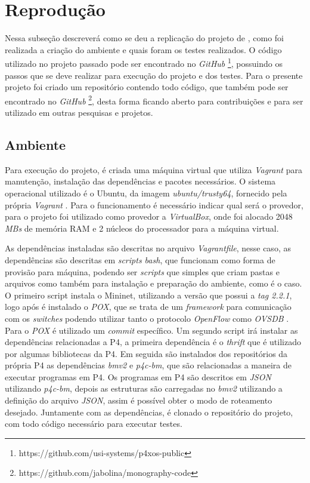 \documentclass[
    12pt,
    openright, 
    oneside,
    a4paper,
    french,
    english,
    brazil
    ]{facom-ufu-abntex2}
\theoremstyle{definition}
\begin{document}
\section{Reprodução}
Nessa subseção descreverá como se deu a replicação do projeto de \cite{dang2016paxos}, como foi realizada 
a criação do ambiente e quais foram os testes
realizados. O código utilizado no projeto passado pode ser encontrado no \emph{GitHub}
\footnote{https://github.com/usi-systems/p4xos-public}, possuindo os passos que
se deve realizar para execução do projeto e dos testes. Para o presente projeto foi 
criado um repositório contendo todo código, que também pode ser encontrado no \emph{GitHub}
\footnote{https://github.com/jabolina/monography-code}, desta forma ficando aberto
para contribuições e para ser utilizado em outras pesquisas e projetos.

\subsection{Ambiente}
Para execução do projeto, é criada uma máquina virtual que utiliza \emph{Vagrant} para
manutenção, instalação das dependências e pacotes necessários. O sistema operacional
utilizado é o Ubuntu, da imagem \emph{ubuntu/trusty64}, fornecido pela própria
\emph{Vagrant} \cite{ubuntuTrusty}. Para o funcionamento é necessário indicar qual será
o provedor, para o projeto foi utilizado como provedor a \emph{VirtualBox}, onde foi
alocado 2048 \emph{MBs} de memória RAM e 2 núcleos do processador para a máquina
virtual.

As dependências instaladas são descritas no arquivo \emph{Vagrantfile}, nesse caso,
as dependências são descritas em \emph{scripts bash}, que funcionam como forma
de provisão para máquina, podendo ser \emph{scripts} que simples que criam pastas e arquivos
como também para instalação e preparação do ambiente, como é o caso. O primeiro script 
instala o Mininet, utilizando a versão que possui a \emph{tag 2.2.1}, logo após é instalado 
o \emph{POX}, que se trata de um \emph{framework} para comunicação com os \emph{switches} podendo 
utilizar tanto o protocolo \emph{OpenFlow} como \emph{OVSDB} \cite{poxWiki}. Para o \emph{POX} 
é utilizado um \emph{commit} específico. Um segundo script irá instalar as dependências 
relacionadas a P4, a primeira dependência é o \emph{thrift} que é utilizado por
algumas bibliotecas da P4. Em seguida são instalados dos repositórios da própria P4
as dependências \emph{bmv2} e \emph{p4c-bm}, que são relacionadas a maneira de executar programas em P4.
Os programas em P4 são descritos em \emph{JSON} utilizando \emph{p4c-bm}, depois as estruturas são 
carregadas no \emph{bmv2} utilizando a definição do arquivo \emph{JSON}, assim é possível obter o modo
de roteamento desejado. Juntamente com as dependências, é clonado o repositório do projeto, 
com todo código necessário para executar testes.
\end{document}
